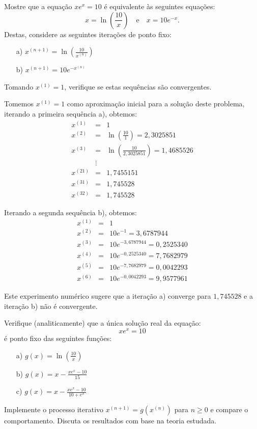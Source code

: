 \begin{exer}
  Mostre que a equação $xe^x = 10$ é equivalente às seguintes equações:
\begin{equation}
  x=\ln\left(\frac{10}{x}\right)\quad\text{e}\quad x=10e^{-x}.
\end{equation}
Destas, considere as seguintes iterações de ponto fixo:
\begin{enumerate}
 \item [a)] $\displaystyle x^{(n+1)}=\ln \left(\frac{10}{x^{(n)}}\right)$
 \item [b)] $\displaystyle x^{(n+1)}=10 e^{-x^{(n)}} $
\end{enumerate}
Tomando $x^{(1)} = 1$, verifique se estas sequências são convergentes.
\end{exer}
\begin{resp}

Tomemos $x^{(1)}=1$ como aproximação inicial para a solução deste problema, iterando a primeira sequência a), obtemos:
\begin{eqnarray}
x^{(1)} &=& 1\\
x^{(2)} &=& \ln\left(\frac{10}{1}\right)=2,3025851\\
x^{(3)} &=& \ln\left(\frac{10}{2,3025851}\right)=1,4685526\\
        &\vdots&\\
x^{(21)}&=& 1,7455151\\
x^{(31)}&=& 1,745528\\
x^{(32)}&=& 1,745528
\end{eqnarray}

Iterando a segunda sequência b), obtemos:
\begin{eqnarray}
x^{(1)}&=&1\\
x^{(2)}&=&10e^{-1}= 3,6787944   \\
x^{(3)}&=&10e^{- 3,6787944 }= 0,2525340     \\
x^{(4)}&=&10e^{-0,2525340}=  7,7682979      \\
x^{(5)}&=&10e^{-7,7682979}=  0,0042293      \\
x^{(6)}&=&10e^{-0,0042293}=  9,9577961
\end{eqnarray}

Este experimento numérico sugere que a iteração a) converge para $1,745528$ e a iteração b) não é convergente.

\end{resp}

\begin{exer} Verifique (analiticamente) que a única solução real da equação:
  \begin{equation}
    xe^x=10
  \end{equation}
é ponto fixo das seguintes funções:
\begin{itemize}
\item[a)] $g(x)=\ln\left(\frac{10}{x}\right)$
\item[b)] $g(x)=x-\frac{xe^{x}-10}{15}$
\item[c)] $g(x)=x-\frac{xe^{x}-10}{10+e^{x}}$
\end{itemize}
Implemente o processo iterativo $x^{(n+1)}=g(x^{(n)})$ para $n\geq 0$ e compare o comportamento. Discuta os resultados com base na teoria estudada.
\end{exer}

